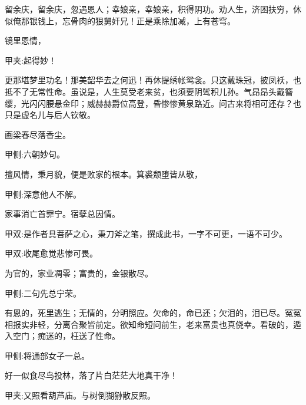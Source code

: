 \begin{qute2sp}
    留余庆，留余庆，忽遇恩人；幸娘亲，幸娘亲，积得阴功。劝人生，济困扶穷，休似俺那银钱上，忘骨肉的狠舅奸兄！正是乘除加减，上有苍穹。
\end{qute2sp}


\begin{qute2sp}
    镜里恩情，\begin{note}甲夹:起得妙！\end{note}更那堪梦里功名！那美韶华去之何迅！再休提绣帐鸳衾。只这戴珠冠，披凤袄，也抵不了无常性命。虽说是，人生莫受老来贫，也须要阴骘积儿孙。气昂昂头戴簪缨，光闪闪腰悬金印；威赫赫爵位高登，昏惨惨黄泉路近。问古来将相可还存？也只是虚名儿与后人钦敬。
\end{qute2sp}


\begin{qute2sp}
    画梁春尽落香尘。\begin{note}甲侧:六朝妙句。\end{note}擅风情，秉月貌，便是败家的根本。箕裘颓堕皆从敬，\begin{note}甲侧:深意他人不解。\end{note}家事消亡首罪宁。宿孽总因情。\begin{note}甲双:是作者具菩萨之心，秉刀斧之笔，撰成此书，一字不可更，一语不可少。\end{note}
\end{qute2sp}


\begin{qute2sp}
    \begin{note}甲双:收尾愈觉悲惨可畏。\end{note}
    为官的，家业凋零；富贵的，金银散尽。\begin{note}甲侧:二句先总宁荣。\end{note}有恩的，死里逃生；无情的，分明照应。欠命的，命已还；欠泪的，泪已尽。冤冤相报实非轻，分离合聚皆前定。欲知命短问前生，老来富贵也真侥幸。看破的，遁入空门；痴迷的，枉送了性命。\begin{note}甲侧:将通部女子一总。\end{note}好一似食尽鸟投林，落了片白茫茫大地真干净！\begin{note}甲夹:又照看葫芦庙。与树倒猢狲散反照。\end{note}
\end{qute2sp}


